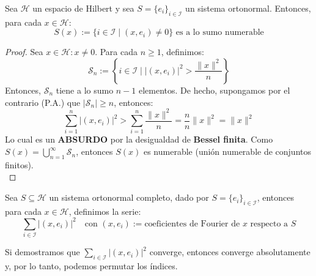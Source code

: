 \begin{prop}
    Sea $\mathcal{H}$ un espacio de Hilbert y sea $S = \{e_i\}_{i \in \mathcal{I}}$ un sistema ortonormal. Entonces, para cada $x \in \mathcal{H}$:
    \[ S(x) := \{ i \in \mathcal{I} \mid (x, e_i) \neq 0 \} \text{ es a lo sumo numerable} \]
\begin{proof} %
    Sea $x \in \mathcal{H} : x \neq 0$. Para cada $n \ge 1$, definimos:
    \[ \mathcal{S}_n := \left\{ i \in \mathcal{I} \mid |(x, e_i)|^2 > \frac{\|x\|^2}{n} \right\} \]
    Entonces, $\mathcal{S}_n$ tiene a lo sumo $n-1$ elementos. De hecho, supongamos por el contrario (P.A.) que $|\mathcal{S}_n| \ge n$, entonces:
    \[ \sum_{i=1}^{n} |(x, e_i)|^2 > \sum_{i=1}^{n} \frac{\|x\|^2}{n} = \frac{n}{n} \|x\|^2 = \|x\|^2 \]
    Lo cual es un \textbf{ABSURDO} por la desigualdad de \textbf{Bessel finita}.
    \noindent
    Como $S(x) = \bigcup_{n=1}^{\infty} \mathcal{S}_n$, entonces $S(x)$ es numerable (unión numerable de conjuntos finitos). \\
\end{proof}
\end{prop}

\begin{definicion}
    Sea $S \subseteq \mathcal{H}$ un sistema ortonormal completo, dado por $S = \{e_i\}_{i \in \mathcal{I}}$, entonces para cada $x \in \mathcal{H}$, definimos la serie:
    \[ \sum_{i \in \mathcal{I}} |(x, e_i)|^2 \quad \text{con } (x, e_i) := \text{coeficientes de Fourier de } x \text{ respecto a } S \]

\end{definicion}

\begin{observacion}
    Si demostramos que $\sum_{i \in \mathcal{I}} |(x, e_i)|^2$ converge, entonces converge absolutamente y, por lo tanto, podemos permutar los índices.
\end{observacion}



